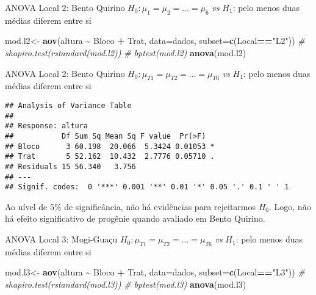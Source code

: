 \documentclass[
  ignorenonframetext,
]{beamer}
\newenvironment{Shaded}{\begin{snugshade}}{\end{snugshade}}
\newcommand{\AttributeTok}[1]{\textcolor[rgb]{0.13,0.29,0.53}{#1}}
\newcommand{\CommentTok}[1]{\textcolor[rgb]{0.56,0.35,0.01}{\textit{#1}}}
\newcommand{\FunctionTok}[1]{\textcolor[rgb]{0.13,0.29,0.53}{\textbf{#1}}}
\newcommand{\NormalTok}[1]{#1}
\newcommand{\OtherTok}[1]{\textcolor[rgb]{0.56,0.35,0.01}{#1}}
\newcommand{\SpecialCharTok}[1]{\textcolor[rgb]{0.81,0.36,0.00}{\textbf{#1}}}
\newcommand{\StringTok}[1]{\textcolor[rgb]{0.31,0.60,0.02}{#1}}
\begin{document}
\begin{frame}[fragile]{ANOVA Local 2: Bento Quirino}
\protect\hypertarget{anova-local-2-bento-quirino}{}
\(H_0: \mu_1 = \mu_2 = \ldots = \mu_6\) \emph{vs} \(H_1\): pelo menos
duas médias diferem entre si

\begin{Shaded}
\begin{Highlighting}[]
\NormalTok{mod.l2}\OtherTok{\textless{}{-}} \FunctionTok{aov}\NormalTok{(altura }\SpecialCharTok{\textasciitilde{}}\NormalTok{ Bloco }\SpecialCharTok{+}\NormalTok{ Trat, }
             \AttributeTok{data=}\NormalTok{dados,}
             \AttributeTok{subset=}\FunctionTok{c}\NormalTok{(Local}\SpecialCharTok{==}\StringTok{"L2"}\NormalTok{))}
\CommentTok{\# shapiro.test(rstandard(mod.l2))}
\CommentTok{\# bptest(mod.l2)}
\FunctionTok{anova}\NormalTok{(mod.l2)}
\end{Highlighting}
\end{Shaded}
\end{frame}

\begin{frame}[fragile]{ANOVA Local 2: Bento Quirino}
\protect\hypertarget{anova-local-2-bento-quirino-1}{}
\(H_0: \mu_{T1} = \mu_{T2} = \ldots = \mu_{T6}\) \emph{vs} \(H_1\): pelo
menos duas médias diferem entre si

\begin{verbatim}
## Analysis of Variance Table
## 
## Response: altura
##           Df Sum Sq Mean Sq F value  Pr(>F)  
## Bloco      3 60.198  20.066  5.3424 0.01053 *
## Trat       5 52.162  10.432  2.7776 0.05710 .
## Residuals 15 56.340   3.756                  
## ---
## Signif. codes:  0 '***' 0.001 '**' 0.01 '*' 0.05 '.' 0.1 ' ' 1
\end{verbatim}

Ao nível de 5\% de significância, não há evidências para rejeitarmos
\(H_0\). Logo, não há efeito significativo de progênie quando avaliado
em Bento Quirino.
\end{frame}

\begin{frame}[fragile]{ANOVA Local 3: Mogi-Guaçu}
\protect\hypertarget{anova-local-3-mogi-guauxe7u}{}
\(H_0: \mu_{T1} = \mu_{T2} = \ldots = \mu_{T6}\) \emph{vs} \(H_1\): pelo
menos duas médias diferem entre si

\begin{Shaded}
\begin{Highlighting}[]
\NormalTok{mod.l3}\OtherTok{\textless{}{-}} \FunctionTok{aov}\NormalTok{(altura }\SpecialCharTok{\textasciitilde{}}\NormalTok{ Bloco }\SpecialCharTok{+}\NormalTok{ Trat, }
             \AttributeTok{data=}\NormalTok{dados, }
             \AttributeTok{subset=}\FunctionTok{c}\NormalTok{(Local}\SpecialCharTok{==}\StringTok{"L3"}\NormalTok{))}
\CommentTok{\# shapiro.test(rstandard(mod.l3))}
\CommentTok{\# bptest(mod.l3)}
\FunctionTok{anova}\NormalTok{(mod.l3)}
\end{Highlighting}
\end{Shaded}
\end{frame}
\end{document}

